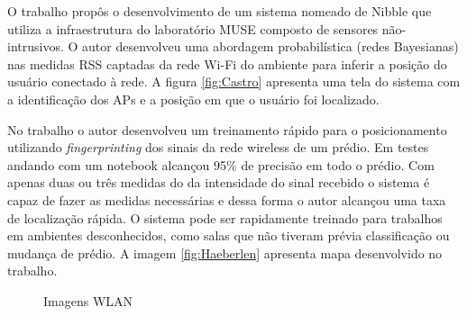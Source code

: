 
O trabalho \cite{Castro2001} propôs o desenvolvimento de um sistema nomeado de Nibble que utiliza a infraestrutura do laboratório MUSE composto de sensores não-intrusivos. O autor desenvolveu uma abordagem probabilística (redes Bayesianas) nas medidas RSS captadas da rede Wi-Fi do ambiente para inferir a posição do usuário conectado à rede. A figura \ref{fig:Castro} apresenta uma tela do sistema com a identificação dos APs e a posição em que o usuário foi localizado.


No trabalho \cite{Haeberlen2004} o autor desenvolveu um treinamento rápido para o posicionamento utilizando \textit{fingerprinting} dos sinais da rede wireless de um prédio. Em testes andando com um notebook alcançou 95\% de precisão em todo o prédio. Com apenas duas ou três medidas do da intensidade do sinal recebido o sistema é capaz de fazer as medidas necessárias e dessa forma o autor alcançou uma taxa de localização rápida. O sistema pode ser rapidamente treinado para trabalhos em ambientes desconhecidos, como salas que não tiveram prévia classificação ou mudança de prédio. A imagem \ref{fig:Haeberlen} apresenta mapa desenvolvido no trabalho.

\begin{figure}
\centering
{}
\caption{Imagens WLAN}
\end{figure}


